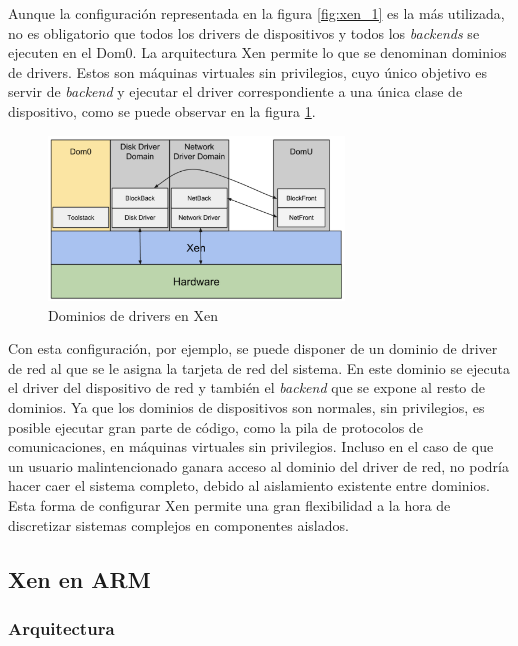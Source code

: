 Aunque la configuración representada en la figura \ref{fig:xen_1} es la más utilizada, no es obligatorio que todos los drivers de dispositivos y todos los \textit{backends} se ejecuten en el Dom0. La arquitectura Xen permite lo que se denominan dominios de drivers. Estos son máquinas virtuales sin privilegios, cuyo único objetivo es servir de \textit{backend} y ejecutar el driver correspondiente a una única clase de dispositivo, como se puede observar en la figura \ref{fig:xen_2}.\\

\begin{figure}[!htb]
  \centering
  \includegraphics[width=0.70\textwidth]{recursos/xen_2.png}
  \caption{Dominios de drivers en Xen}
  \label{fig:xen_2}
\end{figure}

Con esta configuración, por ejemplo, se puede disponer de un dominio de driver de red al que se le asigna la tarjeta de red del sistema. En este dominio se ejecuta el driver del dispositivo de red y también el \textit{backend} que se expone al resto de dominios. Ya que los dominios de dispositivos son normales, sin privilegios, es posible ejecutar gran parte de código, como la pila de protocolos de comunicaciones, en máquinas virtuales sin privilegios. Incluso en el caso de que un usuario malintencionado ganara acceso al dominio del driver de red, no podría hacer caer el sistema completo, debido al aislamiento existente entre dominios. Esta forma de configurar Xen permite una gran flexibilidad a la hora de discretizar sistemas complejos en componentes aislados.

\subsection{Xen en ARM}
\subsubsection{Arquitectura}

